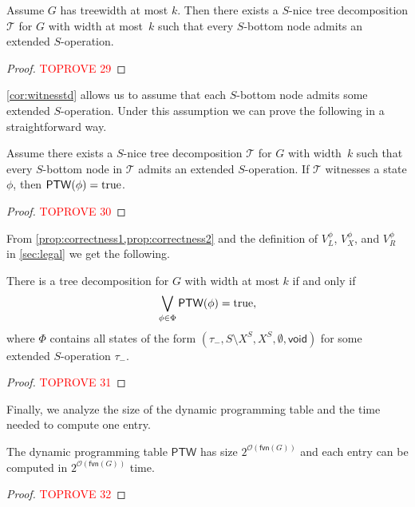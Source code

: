 \documentclass[a4paper,UKenglish,cleveref, autoref, thm-restate, numberwithinsect]{lipics-v2021}
\newcommand{\OO}{\mathcal{O}}
\newcommand{\fvn}{\mathsf{fvn}}
\newcommand{\void}{\mathsf{void}}
\newcommand{\ptw}{\mathsf{PTW}}
\newcommand{\true}{\textup{true}}
\newcommand{\slim}{\text{slim}\xspace}
\begin{document}
\begin{corollary}\label{cor:witnesstd}
    Assume $G$ has treewidth at most $k$. Then there exists a \slim $S$-nice tree decomposition $\mathcal{T}$ for $G$ with width at most~$k$ such that every $S$-bottom node admits an extended $S$-operation.
\end{corollary}
\begin{proof}\textcolor{red}{TOPROVE 29}\end{proof}








\cref{cor:witnesstd} allows us to assume that each $S$-bottom node admits some extended $S$-operation. Under this assumption we can prove the following in a straightforward way.

\begin{proposition}\label{prop:correctness2}
Assume there exists a \slim $S$-nice tree decomposition $\mathcal{T}$ for $G$ with width~$k$ such that every $S$-bottom node in $\mathcal{T}$ admits an extended $S$-operation. If $\mathcal{T}$ witnesses a state $\phi$, then $\ptw(\phi)=\true$.
\end{proposition}


\begin{proof}\textcolor{red}{TOPROVE 30}\end{proof}



From \cref{prop:correctness1,prop:correctness2} and the definition of $V^\phi_L$, $V^\phi_X$, and $V^\phi_R$ in \cref{sec:legal} we get the following.

\begin{corollary}\label{cor:correct}
There is a tree decomposition for $G$ with width at most $k$ if and only if
\[
\bigvee_{\phi\in\Phi}\ptw(\phi)=\true,
\]
where $\Phi$ contains all states of the form $(\tau_-,S\setminus X^S, X^S, \emptyset,\void)$ for some extended $S$-operation $\tau_-$.
\end{corollary}
\begin{proof}\textcolor{red}{TOPROVE 31}\end{proof}


Finally, we analyze the size of the dynamic programming table and the time needed to compute one entry.

\begin{proposition}\label{prop:runningtime}
The dynamic programming table $\ptw$ has size $2^{\OO(\fvn(G))}$ and each entry can be computed in $2^{\OO(\fvn(G))}$ time.
\end{proposition}
\begin{proof}\textcolor{red}{TOPROVE 32}\end{proof}
\end{document}
